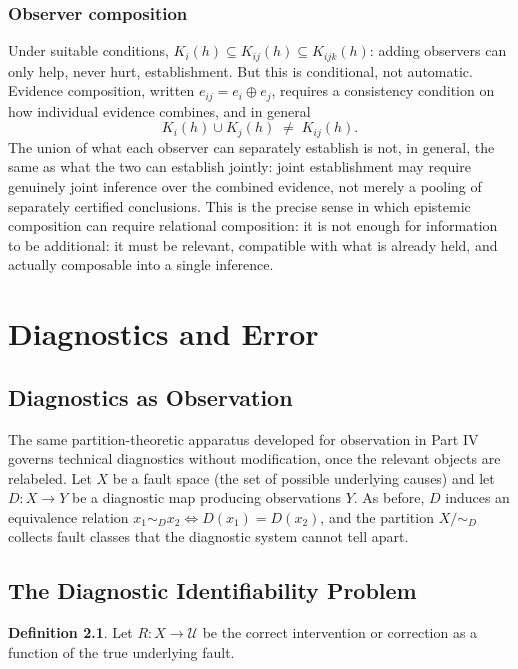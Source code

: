 \documentclass[11pt]{report}
\theoremstyle{definition}
\newtheorem{definition}{Definition}[chapter]
\theoremstyle{plain}
\newcommand{\Uni}{\mathcal{U}}
\begin{document}
\section{Observer composition}
Under suitable conditions, $K_i(h) \subseteq K_{ij}(h) \subseteq K_{ijk}(h)$: adding observers can only help, never hurt, establishment. But this is conditional, not automatic. Evidence composition, written $e_{ij} = e_i \oplus e_j$, requires a consistency condition on how individual evidence combines, and in general
\[
K_i(h) \cup K_j(h) \;\neq\; K_{ij}(h).
\]
The union of what each observer can separately establish is not, in general, the same as what the two can establish jointly: joint establishment may require genuinely joint inference over the combined evidence, not merely a pooling of separately certified conclusions. This is the precise sense in which epistemic composition can require relational composition: it is not enough for information to be additional: it must be relevant, compatible with what is already held, and actually composable into a single inference.

\part{Diagnostics and Error}

\chapter{Diagnostics as Observation}

The same partition-theoretic apparatus developed for observation in Part IV governs technical diagnostics without modification, once the relevant objects are relabeled. Let $X$ be a fault space (the set of possible underlying causes) and let $D: X \to Y$ be a diagnostic map producing observations $Y$. As before, $D$ induces an equivalence relation $x_1 \sim_D x_2 \iff D(x_1) = D(x_2)$, and the partition $X/{\sim_D}$ collects fault classes that the diagnostic system cannot tell apart.

\chapter{The Diagnostic Identifiability Problem}

\begin{definition}
Let $R: X \to \Uni$ be the correct intervention or correction as a function of the true underlying fault.
\end{definition}
\end{document}
